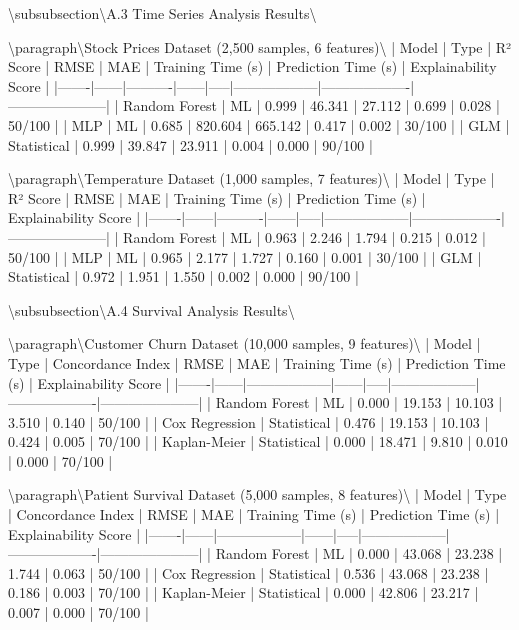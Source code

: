 \documentclass[11pt,a4paper]{article}
\begin{document}
\textbackslash{}subsubsection\textbackslash{}{A.3 Time Series Analysis Results\textbackslash{}}

\textbackslash{}paragraph\textbackslash{}{Stock Prices Dataset (2,500 samples, 6 features)\textbackslash{}}
| Model | Type | R² Score | RMSE | MAE | Training Time (s) | Prediction Time (s) | Explainability Score |
|-------|------|----------|------|-----|------------------|-------------------|---------------------|
| Random Forest | ML | 0.999 | 46.341 | 27.112 | 0.699 | 0.028 | 50/100 |
| MLP | ML | 0.685 | 820.604 | 665.142 | 0.417 | 0.002 | 30/100 |
| GLM | Statistical | 0.999 | 39.847 | 23.911 | 0.004 | 0.000 | 90/100 |

\textbackslash{}paragraph\textbackslash{}{Temperature Dataset (1,000 samples, 7 features)\textbackslash{}}
| Model | Type | R² Score | RMSE | MAE | Training Time (s) | Prediction Time (s) | Explainability Score |
|-------|------|----------|------|-----|------------------|-------------------|---------------------|
| Random Forest | ML | 0.963 | 2.246 | 1.794 | 0.215 | 0.012 | 50/100 |
| MLP | ML | 0.965 | 2.177 | 1.727 | 0.160 | 0.001 | 30/100 |
| GLM | Statistical | 0.972 | 1.951 | 1.550 | 0.002 | 0.000 | 90/100 |

\textbackslash{}subsubsection\textbackslash{}{A.4 Survival Analysis Results\textbackslash{}}

\textbackslash{}paragraph\textbackslash{}{Customer Churn Dataset (10,000 samples, 9 features)\textbackslash{}}
| Model | Type | Concordance Index | RMSE | MAE | Training Time (s) | Prediction Time (s) | Explainability Score |
|-------|------|------------------|------|-----|------------------|-------------------|---------------------|
| Random Forest | ML | 0.000 | 19.153 | 10.103 | 3.510 | 0.140 | 50/100 |
| Cox Regression | Statistical | 0.476 | 19.153 | 10.103 | 0.424 | 0.005 | 70/100 |
| Kaplan-Meier | Statistical | 0.000 | 18.471 | 9.810 | 0.010 | 0.000 | 70/100 |

\textbackslash{}paragraph\textbackslash{}{Patient Survival Dataset (5,000 samples, 8 features)\textbackslash{}}
| Model | Type | Concordance Index | RMSE | MAE | Training Time (s) | Prediction Time (s) | Explainability Score |
|-------|------|------------------|------|-----|------------------|-------------------|---------------------|
| Random Forest | ML | 0.000 | 43.068 | 23.238 | 1.744 | 0.063 | 50/100 |
| Cox Regression | Statistical | 0.536 | 43.068 | 23.238 | 0.186 | 0.003 | 70/100 |
| Kaplan-Meier | Statistical | 0.000 | 42.806 | 23.217 | 0.007 | 0.000 | 70/100 |
\end{document}
